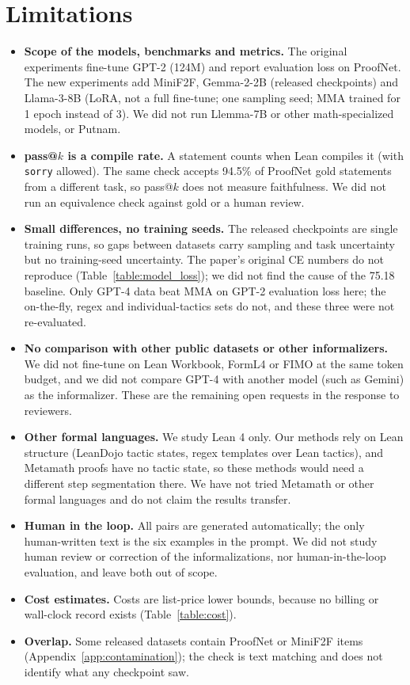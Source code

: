 \documentclass{article} %
\begin{document}
\section{Limitations}
\begin{itemize}
    \item \textbf{Scope of the models, benchmarks and metrics.} The original experiments fine-tune GPT-2 (124M) and report evaluation loss on ProofNet. The new experiments add MiniF2F, Gemma-2-2B (released checkpoints) and Llama-3-8B (LoRA, not a full fine-tune; one sampling seed; MMA trained for 1 epoch instead of 3). We did not run Llemma-7B or other math-specialized models, or Putnam.
    \item \textbf{pass@$k$ is a compile rate.} A statement counts when Lean compiles it (with \texttt{sorry} allowed). The same check accepts 94.5\% of ProofNet gold statements from a different task, so pass@$k$ does not measure faithfulness. We did not run an equivalence check against gold or a human review.
    \item \textbf{Small differences, no training seeds.} The released checkpoints are single training runs, so gaps between datasets carry sampling and task uncertainty but no training-seed uncertainty. The paper's original CE numbers do not reproduce (Table~\ref{table:model_loss}); we did not find the cause of the 75.18 baseline. Only GPT-4 data beat MMA on GPT-2 evaluation loss here; the on-the-fly, regex and individual-tactics sets do not, and these three were not re-evaluated.
    \item \textbf{No comparison with other public datasets or other informalizers.} We did not fine-tune on Lean Workbook, FormL4 or FIMO at the same token budget, and we did not compare GPT-4 with another model (such as Gemini) as the informalizer. These are the remaining open requests in the response to reviewers.
    \item \textbf{Other formal languages.} We study Lean 4 only. Our methods rely on Lean structure (LeanDojo tactic states, regex templates over Lean tactics), and Metamath proofs have no tactic state, so these methods would need a different step segmentation there. We have not tried Metamath or other formal languages and do not claim the results transfer.
    \item \textbf{Human in the loop.} All pairs are generated automatically; the only human-written text is the six examples in the prompt. We did not study human review or correction of the informalizations, nor human-in-the-loop evaluation, and leave both out of scope.
    \item \textbf{Cost estimates.} Costs are list-price lower bounds, because no billing or wall-clock record exists (Table~\ref{table:cost}).
    \item \textbf{Overlap.} Some released datasets contain ProofNet or MiniF2F items (Appendix~\ref{app:contamination}); the check is text matching and does not identify what any checkpoint saw.
\end{itemize}
\end{document}
